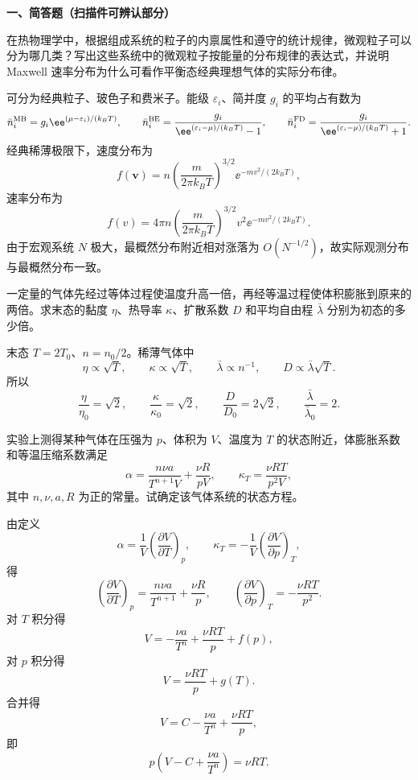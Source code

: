 ﻿

\textbf{一、简答题（扫描件可辨认部分）}

\begin{question}
在热物理学中，根据组成系统的粒子的内禀属性和遵守的统计规律，微观粒子可以分为哪几类？写出这些系统中的微观粒子按能量的分布规律的表达式，并说明 Maxwell 速率分布为什么可看作平衡态经典理想气体的实际分布律。
\begin{solution}
可分为经典粒子、玻色子和费米子。能级 $\varepsilon_i$、简并度 $g_i$ 的平均占有数为
\[
\bar n_i^{\rm MB}=g_i \ee^{(\mu-\varepsilon_i)/(k_BT)},\qquad
\bar n_i^{\rm BE}=\frac{g_i}{\ee^{(\varepsilon_i-\mu)/(k_BT)}-1},\qquad
\bar n_i^{\rm FD}=\frac{g_i}{\ee^{(\varepsilon_i-\mu)/(k_BT)}+1}.
\]
经典稀薄极限下，速度分布为
\[
f(\mathbf v)=n\left(\frac{m}{2\pi k_BT}\right)^{3/2}\ee^{-mv^2/(2k_BT)},
\]
速率分布为
\[
f(v)=4\pi n\left(\frac{m}{2\pi k_BT}\right)^{3/2}v^2\ee^{-mv^2/(2k_BT)}.
\]
由于宏观系统 $N$ 极大，最概然分布附近相对涨落为 $O(N^{-1/2})$，故实际观测分布与最概然分布一致。
\end{solution}
\end{question}

\begin{question}
一定量的气体先经过等体过程使温度升高一倍，再经等温过程使体积膨胀到原来的两倍。求末态的黏度 $\eta$、热导率 $\kappa$、扩散系数 $D$ 和平均自由程 $\bar\lambda$ 分别为初态的多少倍。
\begin{solution}
末态 $T=2T_0$、$n=n_0/2$。稀薄气体中
\[
\eta\propto\sqrt T,
\qquad \kappa\propto\sqrt T,
\qquad \bar\lambda\propto n^{-1},
\qquad D\propto \bar\lambda\sqrt T.
\]
所以
\[
\frac{\eta}{\eta_0}=\sqrt2,
\qquad
\frac{\kappa}{\kappa_0}=\sqrt2,
\qquad
\frac{D}{D_0}=2\sqrt2,
\qquad
\frac{\bar\lambda}{\bar\lambda_0}=2.
\]
\end{solution}
\end{question}

\begin{question}
实验上测得某种气体在压强为 $p$、体积为 $V$、温度为 $T$ 的状态附近，体膨胀系数和等温压缩系数满足
\[
\alpha=\frac{n\nu a}{T^{n+1}V}+\frac{\nu R}{pV},
\qquad
\kappa_T=\frac{\nu RT}{p^2V},
\]
其中 $n,\nu,a,R$ 为正的常量。试确定该气体系统的状态方程。
\begin{solution}
由定义
\[
\alpha=\frac1V\left(\frac{\partial V}{\partial T}\right)_p,
\qquad
\kappa_T=-\frac1V\left(\frac{\partial V}{\partial p}\right)_T,
\]
得
\[
\left(\frac{\partial V}{\partial T}\right)_p=\frac{n\nu a}{T^{n+1}}+\frac{\nu R}{p},
\qquad
\left(\frac{\partial V}{\partial p}\right)_T=-\frac{\nu RT}{p^2}.
\]
对 $T$ 积分得
\[
V=-\frac{\nu a}{T^n}+\frac{\nu RT}{p}+f(p),
\]
对 $p$ 积分得
\[
V=\frac{\nu RT}{p}+g(T).
\]
合并得
\[
V=C-\frac{\nu a}{T^n}+\frac{\nu RT}{p},
\]
即
\[
p\left(V-C+\frac{\nu a}{T^n}\right)=\nu RT.
\]
\end{solution}
\end{question}

